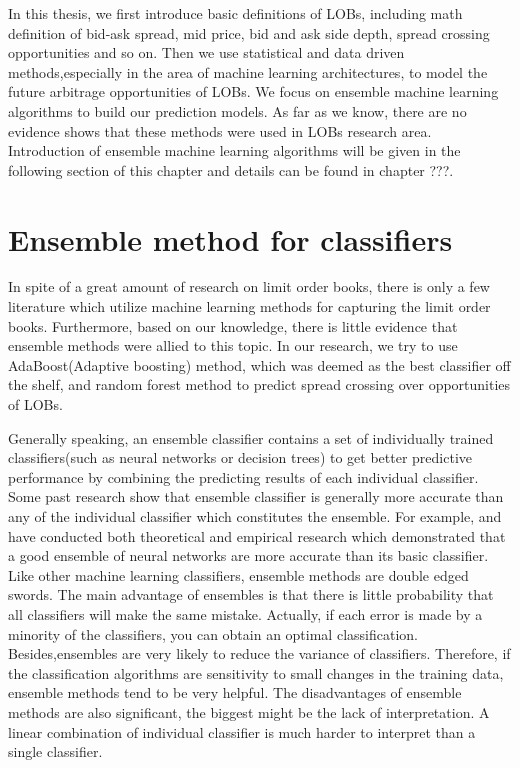 In this thesis, we first introduce basic definitions of LOBs, including math definition of bid-ask spread, mid price, bid and ask side depth, spread crossing opportunities and so on. Then we use statistical and data driven methods,especially in the area of machine learning architectures, to model the future arbitrage opportunities of LOBs. We focus on ensemble machine learning algorithms to build our prediction models. As far as we know, there are no evidence shows that these methods were used in LOBs research area. Introduction of ensemble machine learning algorithms will be given in the following section of this chapter and details can be found in chapter ???.  


\section{Ensemble method for classifiers}

In spite of a great amount of research on limit order books, there is only a few literature which utilize machine learning methods for capturing the limit order books. Furthermore, based on our knowledge, there is little evidence that ensemble methods were allied to this topic. In our research, we try to use AdaBoost(Adaptive boosting) method, which was deemed as the best classifier off the shelf\citep{kegl2013return}, and random forest method to predict spread crossing over opportunities of LOBs. 

Generally speaking, an ensemble classifier contains a set of individually trained classifiers(such as neural networks or decision trees) to get better predictive performance by combining the predicting results of each individual classifier. Some past research show that ensemble classifier is generally more accurate than any of the individual classifier which constitutes the ensemble. For example, \cite{hansen1990neural} and \cite{hashem1997optimal} have conducted both theoretical and empirical research which demonstrated that a good ensemble of neural networks are more accurate than its basic classifier. \\

Like other machine learning classifiers, ensemble methods are double edged swords. The main advantage of ensembles is that there is little probability that all classifiers will make the same mistake. Actually, if each error is made by a minority of the classifiers, you can obtain an optimal classification. Besides,ensembles are very likely to reduce the variance of classifiers. Therefore, if the classification algorithms are sensitivity to small changes in the training data, ensemble methods tend to be very helpful.
The disadvantages of ensemble methods are also significant, the biggest might be the lack of interpretation\citep{buhlmann2012bagging}.  A linear combination of individual classifier is much harder to interpret than a single classifier. 

